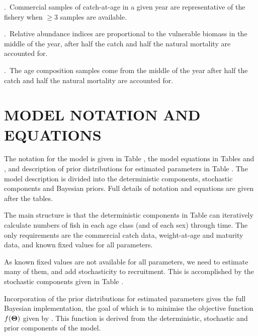 .~Commercial samples of catch-at-age in a given year are representative of the fishery when $\geq$3 samples are available.

.~Relative abundance indices are proportional to the vulnerable biomass in the middle of the year, after half the catch and half the natural mortality are accounted for.

.~The age composition samples come from the middle of the year after half the catch and half the natural mortality are accounted for.

\section{MODEL NOTATION AND EQUATIONS}

The notation for the model is given in Table , the model equations in Tables  and , and description of prior distributions for estimated parameters in Table . The model description is divided into the deterministic components, stochastic components and Bayesian priors. Full details of notation and equations are given after the tables. %


The main structure is that the deterministic components in Table  can iteratively calculate numbers of fish in each age class (and of each sex) through time. The only requirements are the commercial catch data, weight-at-age and maturity data, and known fixed values for all parameters.

As known fixed values are not available for all parameters, we need to estimate many of them, and add stochasticity to recruitment. This is accomplished by the stochastic components given in Table . 

Incorporation of the prior distributions for estimated parameters gives the full Bayesian implementation, the goal of which is to minimise the objective function $f({\bf \Theta})$ given by . This function is derived from the deterministic, stochastic and prior components of the model. %




